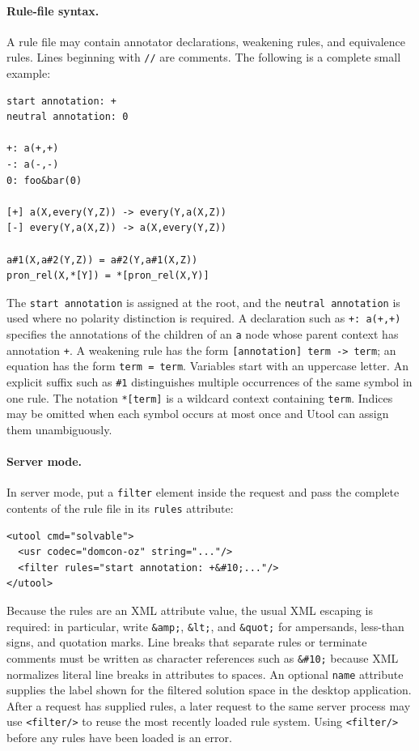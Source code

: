 \paragraph{Rule-file syntax.}
A rule file may contain annotator declarations, weakening rules, and
equivalence rules. Lines beginning with \verb?//? are comments. The
following is a complete small example:

\begin{verbatim}
start annotation: +
neutral annotation: 0

+: a(+,+)
-: a(-,-)
0: foo&bar(0)

[+] a(X,every(Y,Z)) -> every(Y,a(X,Z))
[-] every(Y,a(X,Z)) -> a(X,every(Y,Z))

a#1(X,a#2(Y,Z)) = a#2(Y,a#1(X,Z))
pron_rel(X,*[Y]) = *[pron_rel(X,Y)]
\end{verbatim}

The \verb?start annotation? is assigned at the root, and the
\verb?neutral annotation? is used where no polarity distinction is
required. A declaration such as \verb?+: a(+,+)? specifies the
annotations of the children of an \verb?a? node whose parent context
has annotation \verb?+?. A weakening rule has the form
\verb?[annotation] term -> term?; an equation has the form
\verb?term = term?. Variables start with an uppercase letter. An
explicit suffix such as \verb?#1? distinguishes multiple occurrences
of the same symbol in one rule. The notation \verb?*[term]? is a
wildcard context containing \verb?term?. Indices may be omitted when
each symbol occurs at most once and Utool can assign them
unambiguously.

\paragraph{Server mode.}
In server mode, put a \verb?filter? element inside the request and
pass the complete contents of the rule file in its \verb?rules?
attribute:

\begin{verbatim}
<utool cmd="solvable">
  <usr codec="domcon-oz" string="..."/>
  <filter rules="start annotation: +&#10;..."/>
</utool>
\end{verbatim}

Because the rules are an XML attribute value, the usual XML escaping
is required: in particular, write \verb?&amp;?, \verb?&lt;?, and
\verb?&quot;? for ampersands, less-than signs, and quotation marks.
Line breaks that separate rules or terminate comments must be written as
character references such as \verb?&#10;? because XML normalizes literal
line breaks in attributes to spaces.
An optional \verb?name? attribute supplies the label shown for the filtered
solution space in the desktop application.
After a request has supplied rules, a later request to the same server
process may use \verb?<filter/>? to reuse the most recently loaded
rule system. Using \verb?<filter/>? before any rules have been loaded
is an error.

